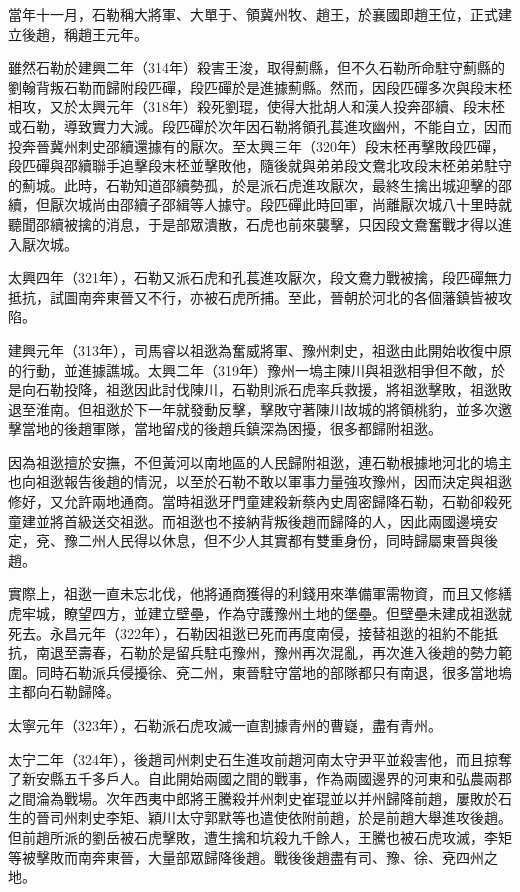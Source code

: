 當年十一月，石勒稱大將軍、大單于、領冀州牧、趙王，於襄國即趙王位，正式建立後趙，稱趙王元年。

雖然石勒於建興二年（314年）殺害王浚，取得薊縣，但不久石勒所命駐守薊縣的劉翰背叛石勒而歸附段匹磾，段匹磾於是進據薊縣。然而，因段匹磾多次與段末柸相攻，又於太興元年（318年）殺死劉琨，使得大批胡人和漢人投奔邵續、段末柸或石勒，導致實力大減。段匹磾於次年因石勒將領孔萇進攻幽州，不能自立，因而投奔晉冀州刺史邵續還據有的厭次。至太興三年（320年）段末柸再擊敗段匹磾，段匹磾與邵續聯手追擊段末柸並擊敗他，隨後就與弟弟段文鴦北攻段末柸弟弟駐守的薊城。此時，石勒知道邵續勢孤，於是派石虎進攻厭次，最終生擒出城迎擊的邵續，但厭次城尚由邵續子邵緝等人據守。段匹磾此時回軍，尚離厭次城八十里時就聽聞邵續被擒的消息，于是部眾潰散，石虎也前來襲擊，只因段文鴦奮戰才得以進入厭次城。

太興四年（321年），石勒又派石虎和孔萇進攻厭次，段文鴦力戰被擒，段匹磾無力抵抗，試圖南奔東晉又不行，亦被石虎所捕。至此，晉朝於河北的各個藩鎮皆被攻陷。

建興元年（313年），司馬睿以祖逖為奮威將軍、豫州刺史，祖逖由此開始收復中原的行動，並進據譙城。太興二年（319年）豫州一塢主陳川與祖逖相爭但不敵，於是向石勒投降，祖逖因此討伐陳川，石勒則派石虎率兵救援，將祖逖擊敗，祖逖敗退至淮南。但祖逖於下一年就發動反擊，擊敗守著陳川故城的將領桃豹，並多次邀擊當地的後趙軍隊，當地留戍的後趙兵鎮深為困擾，很多都歸附祖逖。

因為祖逖擅於安撫，不但黃河以南地區的人民歸附祖逖，連石勒根據地河北的塢主也向祖逖報告後趙的情況，以至於石勒不敢以軍事力量強攻豫州，因而決定與祖逖修好，又允許兩地通商。當時祖逖牙門童建殺新蔡內史周密歸降石勒，石勒卻殺死童建並將首級送交祖逖。而祖逖也不接納背叛後趙而歸降的人，因此兩國邊境安定，兗、豫二州人民得以休息，但不少人其實都有雙重身份，同時歸屬東晉與後趙。

實際上，祖逖一直未忘北伐，他將通商獲得的利錢用來準備軍需物資，而且又修繕虎牢城，瞭望四方，並建立壁壘，作為守護豫州土地的堡壘。但壁壘未建成祖逖就死去。永昌元年（322年），石勒因祖逖已死而再度南侵，接替祖逖的祖約不能抵抗，南退至壽春，石勒於是留兵駐屯豫州，豫州再次混亂，再次進入後趙的勢力範圍。同時石勒派兵侵擾徐、兗二州，東晉駐守當地的部隊都只有南退，很多當地塢主都向石勒歸降。

太寧元年（323年），石勒派石虎攻滅一直割據青州的曹嶷，盡有青州。

太宁二年（324年），後趙司州刺史石生進攻前趙河南太守尹平並殺害他，而且掠奪了新安縣五千多戶人。自此開始兩國之間的戰事，作為兩國邊界的河東和弘農兩郡之間淪為戰場。次年西夷中郎將王騰殺并州刺史崔琨並以并州歸降前趙，屢敗於石生的晉司州刺史李矩、穎川太守郭默等也遣使依附前趙，於是前趙大舉進攻後趙。但前趙所派的劉岳被石虎擊敗，遭生擒和坑殺九千餘人，王騰也被石虎攻滅，李矩等被擊敗而南奔東晉，大量部眾歸降後趙。戰後後趙盡有司、豫、徐、兗四州之地。

